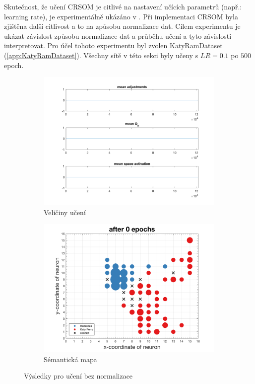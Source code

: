 \documentclass[thesis=M,czech]{FITthesis}[2012/06/26]
\begin{document}
Skutečnost, že učení CRSOM je citlivé na nastavení učících parametrů (např.: learning rate), je experimentálně ukázáno v \cite{hartono14}. Při implementaci CRSOM byla zjištěna další citlivost a to na způsobu normalizace dat.
Cílem experimentu je ukázat závislost způsobu normalizace dat a průběhu učení a tyto závislosti interpretovat. 
Pro účel tohoto experimentu byl zvolen KatyRamDataset (\ref{app:KatyRamDataset}). Všechny sítě v této sekci byly učeny s $LR=0.1$ po $500$ epoch.


\begin{figure}
\centering
\begin{subfigure}{.5\textwidth}
  \centering
  \includegraphics[width=.99\linewidth]{norm-learnattrs0.png}
  \caption{Veličiny učení}
  \label{fig:learnattrs0}
\end{subfigure}%
\begin{subfigure}{.5\textwidth}
  \centering
  \includegraphics[width=.99\linewidth]{exp_kp_ram_norm_0.png}
  \caption{Sémantická mapa}
  \label{fig:resmap0}
\end{subfigure}
\caption{Výsledky pro učení bez normalizace}
\label{fig:nonorm}
\end{figure}
\end{document}
